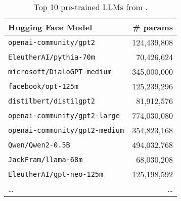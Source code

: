 \begin{table}[h]
\setlength{\tabcolsep}{5pt}
%
\begin{center}
\caption{All 10 pre-trained LLMs from \bencho.}
\label{tab:eval:bencho}
\end{center}
\end{table}


\begin{table}[h]
\setlength{\tabcolsep}{5pt}
\begin{center}
\caption{Top 10 pre-trained LLMs from \bencht.}
\label{tab:eval:benchtwo}
\begin{tabular}{l|r}
\hline
Hugging Face Model & \# params \\
\hline
\texttt{openai-community/gpt2} & 124,439,808 \\
\texttt{EleutherAI/pythia-70m} & 70,426,624 \\
\texttt{microsoft/DialoGPT-medium} & 345,000,000 \\
\texttt{facebook/opt-125m} & 125,239,296 \\
\texttt{distilbert/distilgpt2} & 81,912,576 \\
\texttt{openai-community/gpt2-large} & 774,030,080 \\
\texttt{openai-community/gpt2-medium} & 354,823,168 \\
\texttt{Qwen/Qwen2-0.5B} & 494,032,768 \\
\texttt{JackFram/llama-68m} & 68,030,208 \\
\texttt{EleutherAI/gpt-neo-125m} & 125,198,592 \\
\ldots & \ldots \\
\end{tabular}
\end{center}
\end{table}

